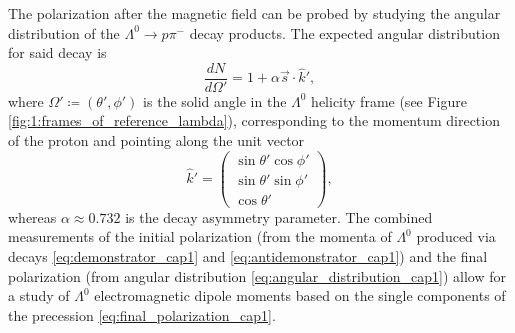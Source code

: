 The polarization after the magnetic field can be probed by studying the angular distribution of the $\Lambda^0 \rightarrow p\pi^-$ decay products.
The expected angular distribution for said decay \cite{EMDipoleSearch} \cite{Richman:153636} \cite{PhysRev.108.1645} is
\begin{equation}
\frac{dN}{d\Omega'} = 1+ \alpha \vec{s} \cdot \hat{k}',
\label{eq:angular_distribution_cap1}
\end{equation}
where $\Omega' \coloneqq (\theta',\phi')$ is the solid angle in the $\Lambda^0$ helicity frame (see Figure \ref{fig:1:frames_of_reference_lambda}), corresponding to the momentum direction of the proton and pointing along the unit vector
\begin{equation}
\hat{k}'
=
\begin{pmatrix}
	\sin \theta' \cos \phi' \\
	\sin \theta' \sin \phi' \\
	\cos \theta'
\end{pmatrix},
\label{eq:1:k_hat}
\end{equation}
whereas $\alpha \approx 0.732$ \cite{PDG} is the decay asymmetry parameter.
The combined measurements of the initial polarization (from the momenta of $\Lambda^0$ produced via decays \eqref{eq:demonstrator_cap1} and \eqref{eq:antidemonstrator_cap1}) and the final polarization (from angular distribution \eqref{eq:angular_distribution_cap1}) allow for a study of $\Lambda^0$ electromagnetic dipole moments based on the single components of the precession \eqref{eq:final_polarization_cap1}.


